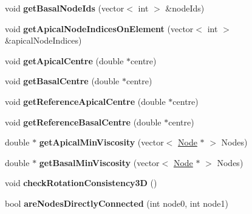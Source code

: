\begin{DoxyCompactItemize}
\item 
\hypertarget{classPrism_aadad90b16d4ca631423ed440bc6a60f6}{}void {\bfseries get\+Basal\+Node\+Ids} (vector$<$ int $>$ \&node\+Ids)\label{classPrism_aadad90b16d4ca631423ed440bc6a60f6}

\item 
\hypertarget{classPrism_af1d4aacb691703fe0d323565d8a00322}{}void {\bfseries get\+Apical\+Node\+Indices\+On\+Element} (vector$<$ int $>$ \&apical\+Node\+Indices)\label{classPrism_af1d4aacb691703fe0d323565d8a00322}

\item 
\hypertarget{classPrism_a66271876c729c19efc54075420a6ea0e}{}void {\bfseries get\+Apical\+Centre} (double $\ast$centre)\label{classPrism_a66271876c729c19efc54075420a6ea0e}

\item 
\hypertarget{classPrism_a65e3e5e85c847579e1929b57ba5374b6}{}void {\bfseries get\+Basal\+Centre} (double $\ast$centre)\label{classPrism_a65e3e5e85c847579e1929b57ba5374b6}

\item 
\hypertarget{classPrism_a151f66d1f21ce8db435c6b9cc08230ed}{}void {\bfseries get\+Reference\+Apical\+Centre} (double $\ast$centre)\label{classPrism_a151f66d1f21ce8db435c6b9cc08230ed}

\item 
\hypertarget{classPrism_a744d31f963b31bfc7f51194988cd4102}{}void {\bfseries get\+Reference\+Basal\+Centre} (double $\ast$centre)\label{classPrism_a744d31f963b31bfc7f51194988cd4102}

\item 
\hypertarget{classPrism_a5b036f4495154c79c0ed36f697faae6e}{}double $\ast$ {\bfseries get\+Apical\+Min\+Viscosity} (vector$<$ \hyperlink{classNode}{Node} $\ast$ $>$ Nodes)\label{classPrism_a5b036f4495154c79c0ed36f697faae6e}

\item 
\hypertarget{classPrism_ad3568f0b36ce18cb87d5e9957f1dfd90}{}double $\ast$ {\bfseries get\+Basal\+Min\+Viscosity} (vector$<$ \hyperlink{classNode}{Node} $\ast$ $>$ Nodes)\label{classPrism_ad3568f0b36ce18cb87d5e9957f1dfd90}

\item 
\hypertarget{classPrism_a85f9b472a3310e76ab0c76bd1fb7dd30}{}void {\bfseries check\+Rotation\+Consistency3\+D} ()\label{classPrism_a85f9b472a3310e76ab0c76bd1fb7dd30}

\item 
\hypertarget{classPrism_ae33eafcdbe69936cca29d7f23649c8cc}{}bool {\bfseries are\+Nodes\+Directly\+Connected} (int node0, int node1)\label{classPrism_ae33eafcdbe69936cca29d7f23649c8cc}

\end{DoxyCompactItemize}
